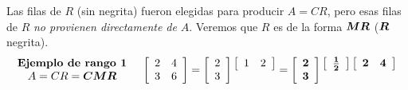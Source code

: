 \documentclass[12pt,a4paper]{article}
\newcommand{\bi}[1]{\hbox{\boldmath$#1$}}
\newcommand\1{\mbox{\,\vrule height-0.8pt depth1.0pt width2pc\,}}
\newcommand\2{\mbox{\,\vrule height-0.8pt depth1.0pt width1pc\,}}
\DeclareRobustCommand\transp{^{\mathrm{T}}}
\begin{document}
\begin{enumerate}
\vspace{5pt}
Las filas de $R$ (sin negrita) fueron elegidas para producir $A=CR$, pero esas filas de $R$ {\it no provienen directamente de} $A$. Veremos que $R$ es de la forma $\bi{M}\bi{R}$ ($\bi{R}$ negrita).
%
$$
\begin{array}{c}\textbf{Ejemplo de rango 1}\\A=CR=\bi{CMR}\end{array}\quad \left[\begin{array}{rr}2&4\\3&6\\\end{array}\right]=\left[\begin{array}{r}2\\3\\\end{array}\right]
\begin{array}{@{\!\,}r@{\!\,}}\left[\begin{array}{rr}1&2\\\end{array}\right]\\\\\end{array}
=\left[\begin{array}{r}\bi{2}\\\bi{3}\\\end{array}\right]
\begin{array}{@{\!\,}r}\left[\begin{array}{r}\bi{\frac{1}{2}}\\\end{array}\right]\left[\begin{array}{rr}\bi{2}&\bi{4}\\\end{array}\right]\\\\\end{array}
$$




\end{enumerate}
\end{document}
